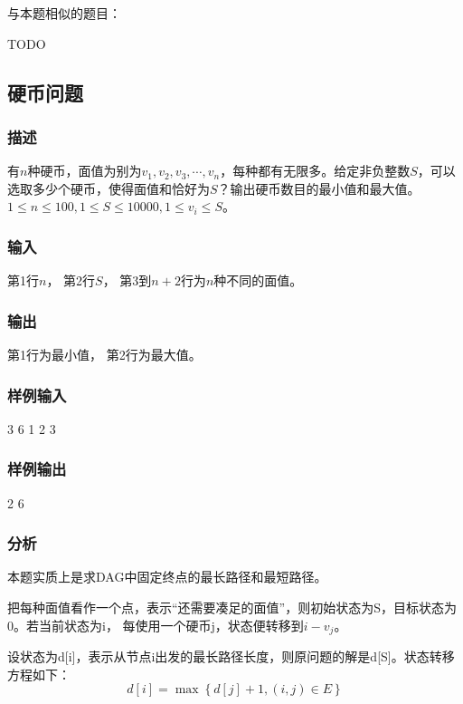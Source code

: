 与本题相似的题目：
\begindot
\item  TODO
\myenddot

\subsection{硬币问题}

\subsubsection{描述}
有$n$种硬币，面值为别为$v_1,v_2,v_3,\cdots, v_n$，每种都有无限多。给定非负整数$S$，可以
选取多少个硬币，使得面值和恰好为$S$？输出硬币数目的最小值和最大值。
$1 \leq n \leq 100, 1 \leq S \leq 10000, 1 \leq v_i \leq S$。

\subsubsection{输入}
第1行$n$，
第2行$S$，
第3到$n+2$行为$n$种不同的面值。

\subsubsection{输出}
第1行为最小值，
第2行为最大值。

\subsubsection{样例输入}
\begin{Code}
3
6
1
2
3
\end{Code}

\subsubsection{样例输出}
\begin{Code}
2
6
\end{Code}

\subsubsection{分析}
本题实质上是求DAG中固定终点的最长路径和最短路径。

把每种面值看作一个点，表示“还需要凑足的面值”，则初始状态为S，目标状态为0。若当前状态为i，
每使用一个硬币j，状态便转移到$i-v_j$。

设状态为d[i]，表示从节点i出发的最长路径长度，则原问题的解是d[S]。状态转移方程如下：
$$d[i]=\max\left\{d[j]+1,(i,j) \in E\right\}$$

